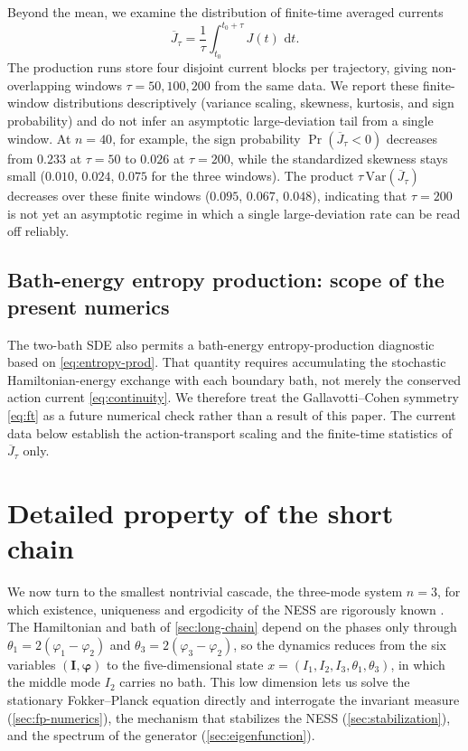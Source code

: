 \documentclass[11pt,a4paper]{article}
\theoremstyle{definition}
\newcommand{\dd}{\,\mathrm{d}}
\numberwithin{equation}{section}   %
\newcommand{\bI}{\mathbf{I}}
\newcommand{\bphi}{\boldsymbol{\varphi}}
\begin{document}
Beyond the mean, we examine the distribution of finite-time averaged currents
\[
  \overline J_\tau=\frac1{\tau}\int_{t_0}^{t_0+\tau}J(t)\,\dd t .
\]
The production runs store four disjoint current blocks per trajectory, giving
non-overlapping windows $\tau=50,100,200$ from the same data. We report these
finite-window distributions descriptively (variance scaling, skewness,
kurtosis, and sign probability) and do not infer an asymptotic large-deviation
tail from a single window. At $n=40$, for example, the sign probability
$\Pr(\overline J_\tau<0)$ decreases from $0.233$ at $\tau=50$ to $0.026$ at
$\tau=200$, while the standardized skewness stays small ($0.010$, $0.024$,
$0.075$ for the three windows). The product
$\tau\,\mathrm{Var}(\overline J_\tau)$ decreases over these finite windows
($0.095$, $0.067$, $0.048$), indicating that $\tau=200$ is not yet an
asymptotic regime in which a single large-deviation rate can be read off
reliably.

\subsection{Bath-energy entropy production: scope of the present numerics}
\label{sec:entropy}

The two-bath SDE also permits a bath-energy entropy-production diagnostic based
on \eqref{eq:entropy-prod}. That quantity requires accumulating the stochastic
Hamiltonian-energy exchange with each boundary bath, not merely the conserved
action current \eqref{eq:continuity}. We therefore treat the Gallavotti--Cohen
symmetry \eqref{eq:ft} as a future numerical check rather than a result of this
paper. The current data below establish the action-transport scaling and the
finite-time statistics of $\overline J_\tau$ only.


\section{Detailed property of the short chain}\label{sec:short-chain}

We now turn to the smallest nontrivial cascade, the three-mode system $n=3$,
for which existence, uniqueness and ergodicity of the NESS are rigorously known
\cite{HLNS}. The Hamiltonian and bath of \cref{sec:long-chain} depend on the
phases only through $\theta_1=2(\varphi_1-\varphi_2)$ and
$\theta_3=2(\varphi_3-\varphi_2)$, so the dynamics reduces from the six
variables $(\bI,\bphi)$ to the five-dimensional state
$x=(I_1,I_2,I_3,\theta_1,\theta_3)$, in which the middle mode $I_2$ carries no
bath. This low dimension lets us solve the stationary Fokker--Planck equation
directly and interrogate the invariant measure (\cref{sec:fp-numerics}), the
mechanism that stabilizes the NESS (\cref{sec:stabilization}), and the spectrum
of the generator (\cref{sec:eigenfunction}).
\end{document}
